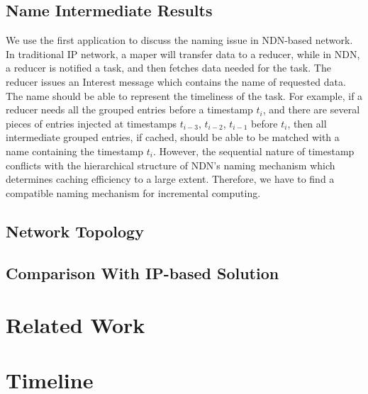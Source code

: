 \documentclass[journal]{IEEEtran}
\begin{document}
\subsection{Name Intermediate Results}
We use the first application to discuss the naming issue in NDN-based network.
In traditional IP network, a maper will transfer data to a reducer, while in
NDN, a reducer is notified a task, and then fetches data needed for the task.
The reducer issues an {\sc Interest} message which contains the name of
requested data.  The name should be able to represent the timeliness of the
task.  For example, if a reducer needs all the grouped entries before a
timestamp $t_i$, and there are several pieces of entries injected at timestamps
$t_{i-3}$, $t_{i-2}$, $t_{i-1}$ before $t_i$, then all intermediate grouped
entries, if cached, should be able to be matched with a name containing the
timestamp $t_i$.  However, the sequential nature of timestamp conflicts with the
hierarchical structure of NDN's naming mechanism which determines caching
efficiency to a large extent. Therefore, we have to find a compatible naming
mechanism for incremental computing.
\subsection{Network Topology}
\subsection{Comparison With IP-based Solution}
\section{Related Work}
\section{Timeline}




\end{document}
